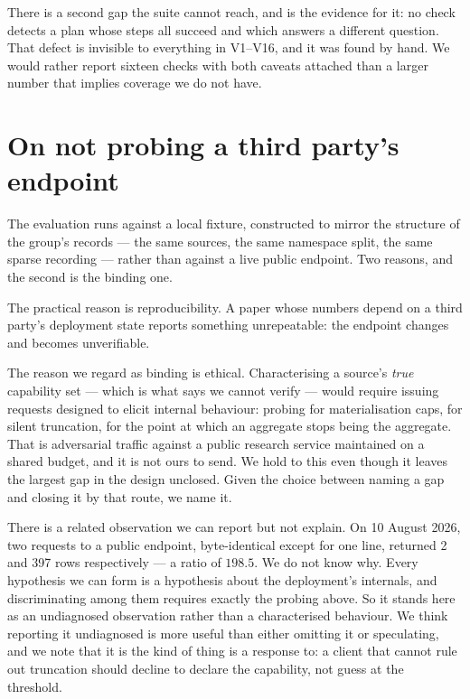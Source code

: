 \documentclass[11pt,a4paper]{article}
\theoremstyle{plain}
\theoremstyle{definition}
\theoremstyle{remark}
\begin{document}
There is a second gap the suite cannot reach, and  is the
evidence for it: no check detects a plan whose steps all succeed and
which answers a different question. That defect is invisible to
everything in V1--V16, and it was found by hand. We would rather report
sixteen checks with both caveats attached than a larger number that
implies coverage we do not have.

\section{On not probing a third party's endpoint}
\label{sec:noprobing}

The evaluation runs against a local fixture, constructed to mirror the
structure of the group's records --- the same sources, the same
namespace split, the same sparse recording --- rather than against a
live public endpoint. Two reasons, and the second is the binding one.

The practical reason is reproducibility. A paper whose numbers depend on
a third party's deployment state reports something unrepeatable: the
endpoint changes and  becomes unverifiable.

The reason we regard as binding is ethical. Characterising a source's
\emph{true} capability set --- which is what  says we
cannot verify --- would require issuing requests designed to elicit
internal behaviour: probing for materialisation caps, for silent
truncation, for the point at which an aggregate stops being the
aggregate. That is adversarial traffic against a public research service
maintained on a shared budget, and it is not ours to send. We hold to
this even though it leaves the largest gap in the design unclosed. Given
the choice between naming a gap and closing it by that route, we name it.

There is a related observation we can report but not explain. On
10 August 2026, two requests to a public endpoint, byte-identical except
for one line, returned 2 and 397 rows respectively --- a ratio of
$198.5$. We do not know why. Every hypothesis we can form is a
hypothesis about the deployment's internals, and discriminating among
them requires exactly the probing above. So it stands here as an
undiagnosed observation rather than a characterised behaviour. We think
reporting it undiagnosed is more useful than either omitting it or
speculating, and we note that it is the kind of thing
 is a response to: a client that cannot rule out
truncation should decline to declare the capability, not guess at the
threshold.
\end{document}
